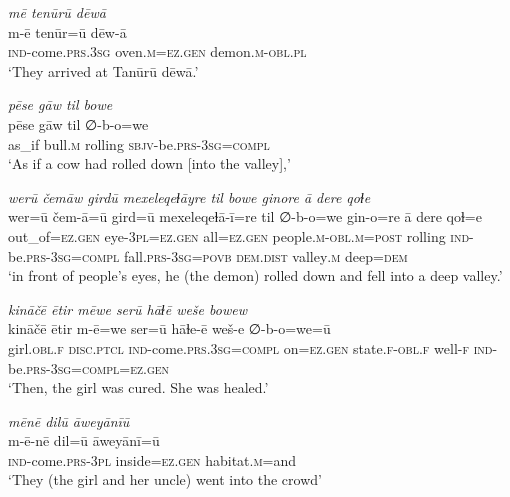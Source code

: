 \ea \label{ZP.77}
\textit{mē tenūrū dēwā} \\ 
\gll m-ē tenūr=ū dēw-ā \\ 
 \textsc{ind-}come\textsc{.prs}\textsc{.3sg} oven\textsc{.m}\textsc{\textsc{=ez.gen}} demon\textsc{.m}\textsc{-obl}\textsc{.pl} \\ 
\glt `They arrived at Tanūrū dēwā.'
\z 
 
\ea \label{ZP.79}
\textit{pēse gāw til bowe} \\ 
\gll pēse gāw til ∅-b-o=we \\ 
 as\_if bull\textsc{.m} rolling \textsc{sbjv-}be\textsc{.prs}\textsc{-3sg}\textsc{=compl} \\ 
\glt `As if a cow had rolled down [into the valley],'
\z 
 
\ea \label{ZP.80}
\textit{werū čemāw girdū mexeleqeɫāyre til bowe ginore ā dere qoɫe} \\ 
\gll wer=ū čem-ā=ū gird=ū mexeleqeɫā-ī=re til ∅-b-o=we gin-o=re ā dere qoɫ=e \\ 
 out\_of\textsc{\textsc{=ez.gen}} eye\textsc{-3pl}\textsc{\textsc{=ez.gen}} all\textsc{\textsc{=ez.gen}} people\textsc{.m}\textsc{-obl}\textsc{.m}\textsc{=\textsc{post}} rolling \textsc{ind-}be\textsc{.prs}\textsc{-3sg}\textsc{=compl} fall\textsc{.prs}\textsc{-3sg}\textsc{=\textsc{povb}} \textsc{dem.dist} valley\textsc{.m} deep\textsc{=dem} \\ 
\glt `in front of people’s eyes, he (the demon) rolled down and fell into a deep valley.'
\z 
 
\ea \label{ZP.82}
\textit{kināčē ētir mēwe serū hāɫē weše bowew} \\ 
\gll kināčē ētir m-ē=we ser=ū hāɫe-ē weš-e ∅-b-o=we=ū \\ 
 girl\textsc{.obl}\textsc{.f} \textsc{disc.ptcl} \textsc{ind-}come\textsc{.prs}\textsc{.3sg}\textsc{=compl} on\textsc{\textsc{=ez.gen}} state\textsc{.f}\textsc{-obl}\textsc{.f} well\textsc{-f} \textsc{ind-}be\textsc{.prs}\textsc{-3sg}\textsc{=compl}\textsc{\textsc{=ez.gen}} \\ 
\glt `Then, the girl was cured. She was healed.'
\z 
 
\ea \label{ZP.83}
\textit{mēnē dilū āweyānīū} \\ 
\gll m-ē-nē dil=ū āweyānī=ū \\ 
 \textsc{ind-}come\textsc{.prs}\textsc{-3pl} inside\textsc{\textsc{=ez.gen}} habitat\textsc{.m}=and \\ 
\glt `They (the girl and her uncle) went into the crowd'
\z 
 
